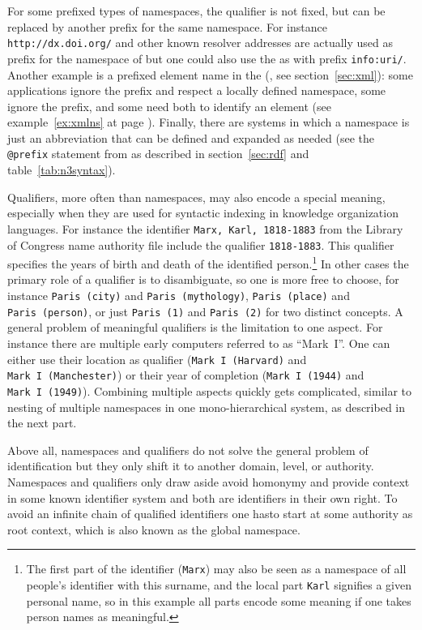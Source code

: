 For some prefixed types of namespaces, the qualifier is not fixed, but
can be replaced by another prefix for the same namespace. For instance
\texttt{http://dx.doi.org/} and other known resolver addresses are actually 
used as prefix for the namespace of 
but one could also use the  as  with prefix \texttt{info:uri/}. Another example is 
a prefixed element name in the  (, 
see section~\ref{sec:xml}): some  applications ignore the prefix and
respect a locally defined namespace, some ignore the prefix, and some need both
to identify an element (see example~\ref{ex:xmlns} at page \pageref{ex:xmlns}). 
Finally, there are
systems in which a namespace is just an abbreviation that can be defined
and expanded as needed (see the \texttt{@prefix} statement from 
 as described in section~\ref{sec:rdf} and 
table~\ref{tab:n3syntax}).

Qualifiers, more often than namespaces, may also encode a special meaning,
especially when they are used for syntactic indexing in knowledge organization
languages. For instance the identifier \texttt{Marx, Karl, 1818-1883} from 
the Library of Congress name authority file include the qualifier 
\texttt{1818-1883}. This qualifier specifies the years of birth and death of 
the identified person.\footnote{The first part of the identifier
(\texttt{Marx}) may also be seen as a namespace of all people's identifier 
with this surname, and the local part \texttt{Karl} signifies a given personal 
name, so in this example all parts encode some meaning if one takes person 
names as meaningful.} In other cases the primary role of a qualifier is to 
disambiguate, so one is more free to choose, for instance \texttt{Paris~(city)} 
and \texttt{Paris~(mythology)}, \texttt{Paris~(place)} and \texttt{Paris~(person)},
or just \texttt{Paris~(1)} and \texttt{Paris~(2)} for two distinct concepts. 
A general problem of meaningful qualifiers is the limitation to one aspect. 
For instance there are multiple early computers referred to as ``Mark~I''. 
One can either use their location as qualifier (\texttt{Mark~I~(Harvard)} and
\texttt{Mark~I~(Manchester)}) or their year of completion 
(\texttt{Mark~I~(1944)} and \texttt{Mark~I~(1949)}). Combining multiple
aspects quickly gets complicated, similar to nesting of multiple namespaces
in one mono-hierarchical system, as described in the next part.

Above all, namespaces and qualifiers do not solve the general problem of
identification but they only shift it to another domain, level, or authority.
Namespaces and qualifiers only draw aside avoid homonymy and provide context 
in some known identifier system and both are identifiers in their own right. 
To avoid an infinite chain of qualified identifiers one hasto start at some 
authority as root context, which is also known as the global namespace.

